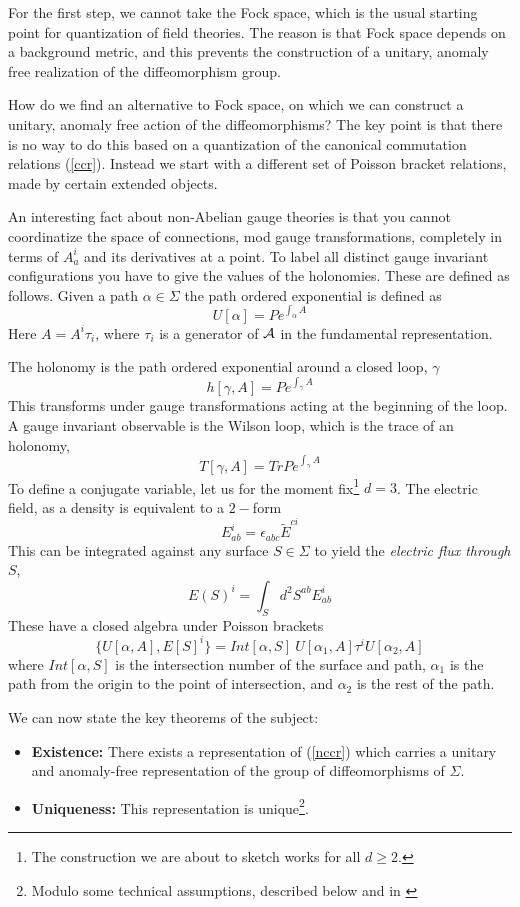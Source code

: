 \documentclass[12pt]{article}
\newcommand{\f}{\begin{equation}}
\newcommand{\ff}{\end{equation}}
\begin{document}
For the first step, we cannot take the Fock space, which is the usual
starting point for quantization of field theories. The reason is that Fock space depends
on a background metric, and this prevents the construction of a unitary, anomaly
free realization of the diffeomorphism group.  

How do we find an alternative to Fock space, on which we can construct
a unitary, anomaly free action of the diffeomorphisms?   The key point is
that there is no way to do this based on a quantization of the
canonical commutation relations (\ref{ccr}).  Instead we start with
a different set of Poisson bracket relations, made by certain
extended objects.  

An interesting fact about non-Abelian gauge theories is that you cannot
coordinatize the space of connections, mod gauge transformations, completely in terms of $A_a^i$ and
its derivatives at a point\cite{wu-connections}.  To label all distinct
gauge invariant configurations you have to give the values of the 
holonomies. These are defined as follows.   
Given a path  $\alpha \in \Sigma$ the path ordered
exponential is defined as 
\f
U[\alpha ] = P e^{\int_\alpha   A}
\ff
Here $A= A^i\tau_i$, where $\tau_i$ is a generator of 
$\cal A$ in the fundamental representation. 

The  holonomy 
is  the path ordered exponential around a closed loop, $\gamma$
\f
h[\gamma, A] =  P e^{\int_\gamma A}
\ff
This transforms under gauge transformations acting at the beginning of the
loop.  A gauge invariant observable is the Wilson loop, 
which is the trace of an holonomy, 
\f
T[\gamma, A] = Tr P e^{\int_\gamma A}
\ff
To define a conjugate variable, let us for the moment fix\footnote{The construction we are about to sketch works for all $d \geq 2$.}  $d=3$.  The electric
field, as a density is  equivalent to a $2-$form
\f
E_{ab}^i = \epsilon_{abc}\tilde{E}^{c i}
\ff 
This can be integrated against any surface $S \in \Sigma$ to yield
the {\it electric flux through $S$},
\f
E(S)^i = \int_S d^2 S^{ab} E_{ab}^i
\ff
These have a closed algebra under Poisson brackets
\f
\{ U[\alpha , A] , E[S]^i \} = Int [\alpha, S] \  U[\alpha_1 , A]  \tau^i U[\alpha_2 , A]
\label{nccr}
\ff
where $Int [\alpha, S]$ is the intersection number of the surface and 
path, $\alpha_1$ is the path from the origin to the point of intersection,
and $\alpha_2$ is the rest of the path. 

We can now state the key theorems of the subject:

\begin{itemize}

\item{} {\bf Existence:}  There exists a representation of (\ref{nccr}) which
carries a unitary and anomaly-free representation of the group
of diffeomorphisms of $\Sigma$. 

\item{}{\bf Uniqueness: } This representation is unique\cite{unique}\footnote{Modulo some technical assumptions, described below and in \cite{unique}}.  

\end{itemize}
\end{document}
